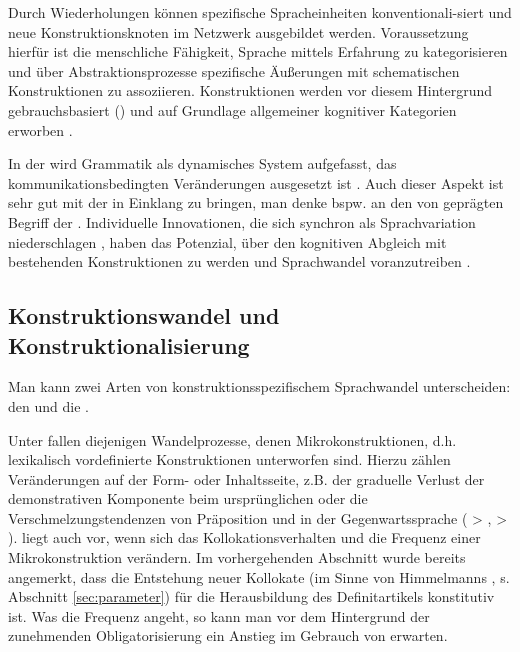 Durch Wiederholungen können spezifische Spracheinheiten konventionali-\linebreak siert und neue Konstruktionsknoten im Netzwerk ausgebildet werden. Voraussetzung hierfür ist die menschliche Fähigkeit, Sprache mittels Erfahrung zu kategorisieren und über Abstraktionsprozesse spezifische Äußerungen mit schematischen Konstruktionen zu assoziieren. Konstruktionen werden vor diesem Hintergrund gebrauchsbasiert () und auf Grundlage allgemeiner kognitiver Kategorien erworben \parencite[u.a.][]{Langacker1987,Goldberg2006,Bybee2006,Bybee2010,Bybee2013}.

In der  wird Grammatik als dynamisches System aufgefasst, das kommunikationsbedingten Veränderungen ausgesetzt ist \parencite[35--36]{Imo2007}. Auch dieser Aspekt ist sehr gut mit der  in Einklang zu bringen, man denke bspw. an den von  \textcite{Hopper1991} geprägten Begriff der . Individuelle Innovationen, die sich synchron als Sprachvariation niederschlagen \parencite{Croft2010}, haben das Potenzial, über den kognitiven Abgleich mit bestehenden Konstruktionen  zu werden und Sprachwandel voranzutreiben \parencite[66]{Langacker1987}. 

\subsection{Konstruktionswandel und Konstruktionalisierung}\label{sec:konstruktionalisierung}

Man kann zwei Arten von konstruktionsspezifischem Sprachwandel unterscheiden: den  und die  \parencite[vgl.][]{Hilpert2011,Hilpert2013,Fried2013,Traugott2013,Traugott2015,Trousdale2014}. 

Unter  fallen diejenigen Wandelprozesse, denen Mikrokonstruktionen, d.h. lexikalisch vordefinierte Konstruktionen  unterworfen sind. Hierzu zählen Veränderungen auf der Form- oder Inhaltsseite, z.B. der graduelle Verlust der demonstrativen Komponente beim ursprünglichen   oder die Verschmelzungstendenzen von Präposition und  in der Gegenwartssprache ( > ,  > ).  liegt auch vor, wenn sich das Kollokationsverhalten und die Frequenz einer Mikrokonstruktion  verändern. Im vorhergehenden Abschnitt wurde bereits angemerkt, dass die Entstehung neuer Kollokate (im Sinne von Himmelmanns  , s. Abschnitt \ref{sec:parameter}) für die Herausbildung des Definitartikels konstitutiv ist. Was die Frequenz angeht, so kann man vor dem Hintergrund der zunehmenden Obligatorisierung ein Anstieg im Gebrauch von  erwarten. 

